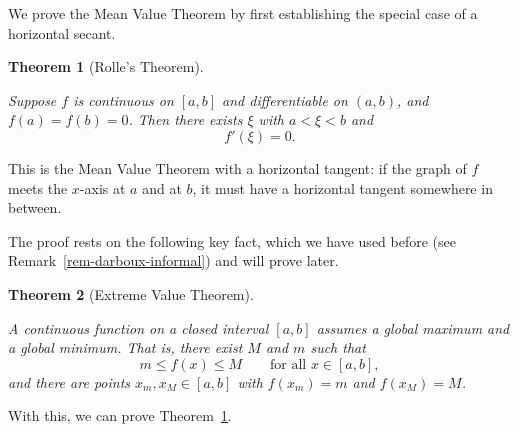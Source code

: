 \documentclass[
  letterpaper,
  DIV=11,
  numbers=noendperiod]{scrreprt}
\theoremstyle{plain}
\theoremstyle{plain}
\theoremstyle{definition}
\theoremstyle{definition}
\theoremstyle{definition}
\theoremstyle{plain}
\newtheorem{theorem}{Theorem}[chapter]
\theoremstyle{plain}
\theoremstyle{remark}
\begin{document}
We prove the Mean Value Theorem by first establishing the special case
of a horizontal secant.

\begin{theorem}[Rolle's
Theorem]\protect\hypertarget{thm-rolle}{}\label{thm-rolle}

Suppose \(f\) is continuous on \([a,b]\) and differentiable on
\((a,b)\), and \(f(a)=f(b)=0\). Then there exists \(\xi\) with
\(a<\xi<b\) and \[
f'(\xi) = 0.
\]

\end{theorem}

This is the Mean Value Theorem with a horizontal tangent: if the graph
of \(f\) meets the \(x\)-axis at \(a\) and at \(b\), it must have a
horizontal tangent somewhere in between.

The proof rests on the following key fact, which we have used before
(see Remark~\ref{rem-darboux-informal}) and will prove later.

\begin{theorem}[Extreme Value
Theorem]\protect\hypertarget{thm-evt}{}\label{thm-evt}

A continuous function on a closed interval \([a,b]\) assumes a global
maximum and a global minimum. That is, there exist \(M\) and \(m\) such
that \[
m \le f(x) \le M \qquad\text{for all } x\in[a,b],
\] and there are points \(x_m, x_M\in[a,b]\) with \(f(x_m)=m\) and
\(f(x_M)=M\).

\end{theorem}

With this, we can prove Theorem~\ref{thm-rolle}.
\end{document}
